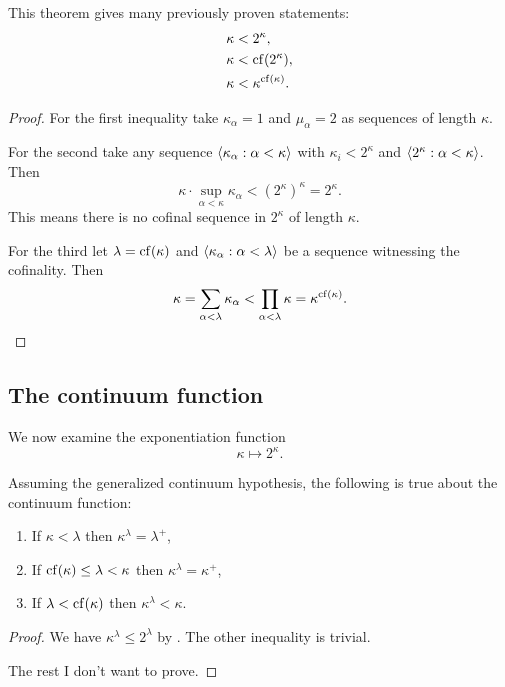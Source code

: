 \begin{corollary}
    This theorem gives many previously proven statements:
    \begin{align*}
        \kappa & <2^{\kappa},           \\
        \kappa & <\operatorname{cf}(2^{\kappa}),      \\
        \kappa & <\kappa^{\operatorname{cf}(\kappa)}.
    \end{align*}

    \begin{proof}
        For the first inequality take \(\kappa_{\alpha}=1\) and
        \(\mu_{\alpha}=2\) as sequences of length \(\kappa\).

        For the second take any sequence
        \(\left<\kappa_{\alpha}:\alpha<\kappa\right>\) with
        \(\kappa_{i}<2^{\kappa}\) and \(\left<2^{\kappa}:\alpha<\kappa\right>\).
        Then
        \[
            \kappa\cdot\sup_{\alpha<\kappa}\kappa_{\alpha}<(2^{\kappa})^{\kappa}=2^{\kappa}.
        \]
        This means there is no cofinal sequence in \(2^{\kappa}\) of length
        \(\kappa\).

        For the third let \(\lambda=\operatorname{cf}(\kappa)\) and
        \(\left<\kappa_{\alpha}:\alpha<\lambda\right>\) be a sequence witnessing
        the cofinality. Then
        \[
            \kappa=\sum_{\alpha<\lambda}\kappa_{\alpha}<\prod_{\alpha<\lambda}\kappa=\kappa^{\operatorname{cf}(\kappa)}.
        \]
    \end{proof}
\end{corollary}

\subsection{The continuum function}
We now examine the exponentiation function
\[
    \kappa\mapsto 2^{\kappa}.
\]

\begin{proposition}
    Assuming the generalized continuum hypothesis, the following is true about
    the continuum function:
    \begin{enumerate}
        \item If \(\kappa<\lambda\)  then \(\kappa^{\lambda}=\lambda^{+}\),
        \item If \(\operatorname{cf}(\kappa)\leq\lambda<\kappa\) then
              \(\kappa^{\lambda}=\kappa^{+}\),
        \item If \(\lambda<\operatorname{cf}(\kappa)\) then \(\kappa^{\lambda}<\kappa\).
    \end{enumerate}

    \begin{proof}
        We have \(\kappa^{\lambda}\leq2^{\lambda}\) by .
        The other inequality is trivial.

        The rest I don't want to prove.
    \end{proof}
\end{proposition}

